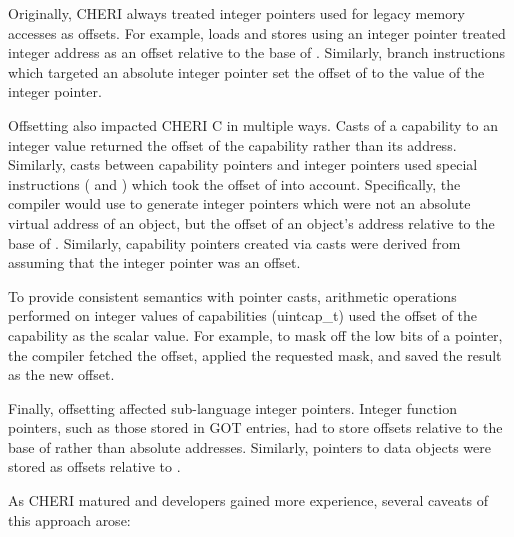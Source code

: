 Originally, CHERI always treated integer pointers used for legacy
memory accesses as offsets.  For example, loads and stores using an
integer pointer treated integer address as an offset relative to the
base of \DDC{}.  Similarly, branch instructions which targeted an
absolute integer pointer set the offset of \PCC{} to the value of the
integer pointer.

Offsetting also impacted CHERI C in multiple ways.
Casts of a capability to an integer value returned the offset of the
capability rather than its address.  Similarly, casts between
capability pointers and integer pointers used special instructions
( and ) which took the offset of
\DDC{} into account.  Specifically, the compiler would use
 to generate integer pointers which were not an
absolute virtual address of an object, but the offset of an object's
address relative to the base of \DDC{}.  Similarly, capability
pointers created via casts were derived from \DDC{} assuming that the
integer pointer was an offset.

To provide consistent semantics with pointer casts, arithmetic
operations performed on integer values of capabilities (uintcap\_t)
used the offset of the capability as the scalar value.  For example,
to mask off the low bits of a pointer, the compiler fetched the
offset, applied the requested mask, and saved the result as the new
offset.

Finally, offsetting affected sub-language integer pointers.  Integer
function pointers, such as those stored in GOT entries, had to store
offsets relative to the base of \PCC{} rather than absolute addresses.
Similarly, pointers to data objects were stored as offsets relative to
\DDC{}.

As CHERI matured and developers gained more experience, several
caveats of this approach arose:

